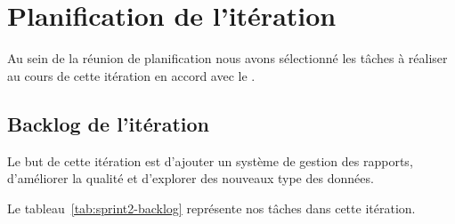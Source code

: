 \section{Planification de l'itération}

Au sein de la réunion de planification nous avons sélectionné les tâches à
réaliser au cours de cette itération en accord avec le .

\subsection{Backlog de l'itération}

Le but de cette itération est d'ajouter un système de gestion des rapports,
d'améliorer la qualité et d'explorer des nouveaux type des données.

Le tableau~\ref{tab:sprint2-backlog} représente nos tâches dans cette
itération.

